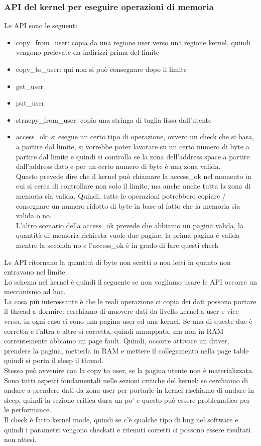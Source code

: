 \documentclass[12pt, oneside]{extbook}
\begin{document}
\subsubsection{API del kernel per eseguire operazioni di memoria}
Le API sono le seguenti
\begin{itemize}
\item \textsf{copy\_from\_user}: copia da una regione user verso una regione kernel, quindi vengono prelevate da indirizzi prima del limite
\item \textsf{copy\_to\_user}: qui non si può consegnare dopo il limite
\item \textsf{get\_user}
\item \textsf{put\_user}
\item \textsf{strncpy\_from\_user}: copia una stringa di taglia fissa dall'utente
\item \textsf{access\_ok}: si esegue un certo tipo di operazione, ovvero un check che si basa, a partire dal limite, si vorrebbe poter lavorare su un certo numero di byte a partire dal limite e quindi si controlla se la zona dell'address space a partire dall'address dato e per un certo numero di byte è una zona valida.\\Questo prevede dire che il kernel può chiamare la access\_ok nel momento in cui si cerca di controllare non solo il limite, ma anche anche tutta la zona di memoria sia valida. Quindi, tutte le operazioni potrebbero copiare / consegnare un numero ridotto di byte in base al fatto che la memoria sia valida o no.\\L'altro scenario della access\_ok prevede che abbiamo un pagina valida, la quantità di memoria richiesta vuole due pagine, la prima pagina è valida mentre la seconda no e l'access\_ok è in grado di fare questi check 
\end{itemize}
Le API ritornano la quantità di byte non scritti o non letti in quanto non entravano nel limite.\\Lo schema nel kernel è quindi il seguente
se non vogliamo usare le API occorre un meccanismo ad hoc.\\La cosa più interessante è che le reali operazione ci copia dei dati possono portare il thread a dormire: cerchiamo di muovere dati da livello kernel a user e vice versa, in ogni caso ci sono una pagina user ed una kernel. Se una di queste due è corretta e l'altra è altre sì corretta, quindi mmappata, ma non in RAM correntemente abbiamo un page fault. Quindi, occorre attivare un driver, prendere la pagina, metterla in RAM e mettere il collegamento nella page table quindi si porta il sleep il thread.\\Stesso può avvenire con la copy to user, se la pagina utente non è materializzata.\\Sono tutti aspetti fondamentali nelle sezioni critiche del kernel: se cerchiamo di andare a prendere dati da zona user per portarle in kernel rischiamo di andare in sleep, quindi la sezione critica dura un po' e questo può essere problematico per le performance.\\Il check è fatto kernel mode, quindi se c'è qualche tipo di bug nel software e quindi i parametri vengono checkati e ritenuti corretti ci possono essere risultati non attesi.
\end{document}
